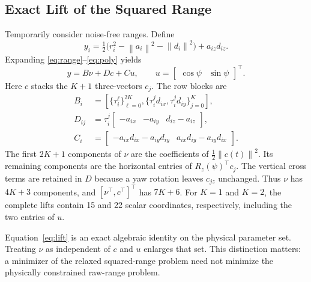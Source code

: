 \documentclass[conference,letterpaper,10pt]{IEEEtran}
\newcommand{\norm}[1]{\left\lVert#1\right\rVert}
\newcommand{\rz}{R_z}
\begin{document}
\subsection{Exact Lift of the Squared Range}
Temporarily consider noise-free ranges. Define
\begin{equation}
 y_i=\tfrac12\bigl(r_i^2-\norm{a_i}^2-\norm{d_i}^2\bigr)+a_{iz}d_{iz}.
 \label{eq:y}
\end{equation}
Expanding \eqref{eq:range}--\eqref{eq:poly} yields
\begin{equation}
 y=B\nu+D c+C u,\qquad
 u=\begin{bmatrix}\cos\psi&\sin\psi\end{bmatrix}^{\!\top}.
 \label{eq:lift}
\end{equation}
Here $c$ stacks the $K+1$ three-vectors $c_j$. The row blocks are
\begin{align}
 B_i&=\left[\{\tau_i^\ell\}_{\ell=0}^{2K},
       \{\tau_i^j d_{ix},\tau_i^j d_{iy}\}_{j=0}^{K}\right],\label{eq:b}\\
 D_{ij}&=\tau_i^j\begin{bmatrix}-a_{ix}&-a_{iy}&d_{iz}-a_{iz}\end{bmatrix},\label{eq:d}\\
 C_i&=\begin{bmatrix}
  -a_{ix}d_{ix}-a_{iy}d_{iy}&a_{ix}d_{iy}-a_{iy}d_{ix}
 \end{bmatrix}.\label{eq:c}
\end{align}
The first $2K+1$ components of $\nu$ are the coefficients of $\frac12\norm{c(t)}^2$. Its remaining components are the horizontal entries of $\rz(\psi)^\top c_j$. The vertical cross terms are retained in $D$ because a yaw rotation leaves $c_{jz}$ unchanged. Thus $\nu$ has $4K+3$ components, and $[\nu^\top,c^\top]^\top$ has $7K+6$. For $K=1$ and $K=2$, the complete lifts contain 15 and 22 scalar coordinates, respectively, including the two entries of $u$.

Equation~\eqref{eq:lift} is an exact algebraic identity on the physical parameter set. Treating $\nu$ as independent of $c$ and $u$ enlarges that set. This distinction matters: a minimizer of the relaxed squared-range problem need not minimize the physically constrained raw-range problem.
\end{document}
